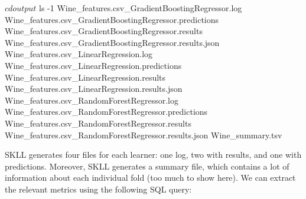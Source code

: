 \documentclass[
]{book}
\newenvironment{Shaded}{\begin{snugshade}}{\end{snugshade}}
\newcommand{\BuiltInTok}[1]{#1}
\newcommand{\ExtensionTok}[1]{#1}
\newcommand{\FunctionTok}[1]{\textcolor[rgb]{0.00,0.00,0.00}{#1}}
\newcommand{\KeywordTok}[1]{\textcolor[rgb]{0.13,0.29,0.53}{\textbf{#1}}}
\newcommand{\NormalTok}[1]{#1}
\newcommand{\OperatorTok}[1]{\textcolor[rgb]{0.81,0.36,0.00}{\textbf{#1}}}
\newcommand{\StringTok}[1]{\textcolor[rgb]{0.31,0.60,0.02}{#1}}
\theoremstyle{definition}
\theoremstyle{definition}
\theoremstyle{definition}
\theoremstyle{remark}
\begin{document}
\begin{Shaded}
\begin{Highlighting}[]
\NormalTok{$ }\BuiltInTok{cd}\NormalTok{ output}
\NormalTok{$ }\FunctionTok{ls}\NormalTok{ -1}
\ExtensionTok{Wine_features.csv_GradientBoostingRegressor.log}
\ExtensionTok{Wine_features.csv_GradientBoostingRegressor.predictions}
\ExtensionTok{Wine_features.csv_GradientBoostingRegressor.results}
\ExtensionTok{Wine_features.csv_GradientBoostingRegressor.results.json}
\ExtensionTok{Wine_features.csv_LinearRegression.log}
\ExtensionTok{Wine_features.csv_LinearRegression.predictions}
\ExtensionTok{Wine_features.csv_LinearRegression.results}
\ExtensionTok{Wine_features.csv_LinearRegression.results.json}
\ExtensionTok{Wine_features.csv_RandomForestRegressor.log}
\ExtensionTok{Wine_features.csv_RandomForestRegressor.predictions}
\ExtensionTok{Wine_features.csv_RandomForestRegressor.results}
\ExtensionTok{Wine_features.csv_RandomForestRegressor.results.json}
\ExtensionTok{Wine_summary.tsv}
\end{Highlighting}
\end{Shaded}

SKLL generates four files for each learner: one log, two with results, and one with predictions. Moreover, SKLL generates a summary file, which contains a lot of information about each individual fold (too much to show here). We can extract the relevant metrics using the following SQL query:

\begin{Shaded}
\end{Shaded}
\end{document}
